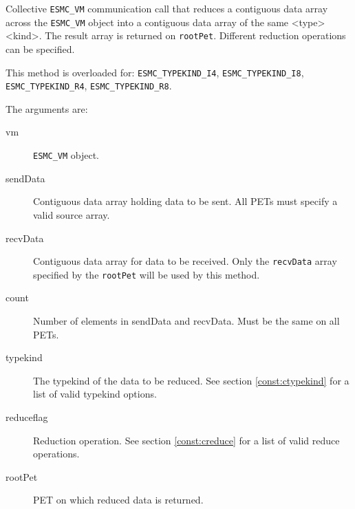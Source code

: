   
    Collective {\tt ESMC\_VM} communication call that reduces a contiguous data 
    array across the {\tt ESMC\_VM} object into a contiguous data array of 
    the same <type><kind>. The result array is returned on {\tt rootPet}. 
    Different reduction operations can be specified.
  
    This method is overloaded for:
    {\tt ESMC\_TYPEKIND\_I4}, {\tt ESMC\_TYPEKIND\_I8},
    {\tt ESMC\_TYPEKIND\_R4}, {\tt ESMC\_TYPEKIND\_R8}.
  
    The arguments are:
    \begin{description}
    \item[vm] 
      {\tt ESMC\_VM} object.
    \item[sendData]
      Contiguous data array holding data to be sent. All PETs must specify a
      valid source array.
    \item[recvData] 
      Contiguous data array for data to be received. Only the {\tt recvData}
      array specified by the {\tt rootPet} will be used by this method.
    \item[count] 
      Number of elements in sendData and recvData. Must be the same on all PETs.
    \item[typekind]
      The typekind of the data to be reduced. See section 
      \ref{const:ctypekind} for a list of valid typekind options.
    \item[reduceflag] 
      Reduction operation. See section \ref{const:creduce} for a list of 
      valid reduce operations.
    \item[rootPet] 
      PET on which reduced data is returned.
    \end{description}
  
\setlength{\parskip}{\oldparskip}
\setlength{\parindent}{\oldparindent}
\setlength{\baselineskip}{\oldbaselineskip}
